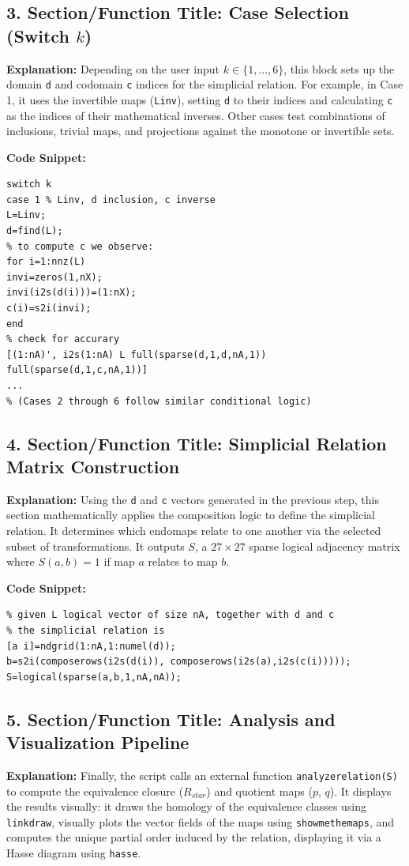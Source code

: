 \subsection{3. Section/Function Title: Case Selection (Switch $k$)}
\textbf{Explanation:} 
Depending on the user input $k \in \{1, \dots, 6\}$, this block sets up the domain \texttt{d} and codomain \texttt{c} indices for the simplicial relation. For example, in Case 1, it uses the invertible maps (\texttt{Linv}), setting \texttt{d} to their indices and calculating \texttt{c} as the indices of their mathematical inverses. Other cases test combinations of inclusions, trivial maps, and projections against the monotone or invertible sets.

\textbf{Code Snippet:}
\begin{lstlisting}
switch k
case 1 % Linv, d inclusion, c inverse
L=Linv;
d=find(L);
% to compute c we observe:
for i=1:nnz(L)
invi=zeros(1,nX);
invi(i2s(d(i)))=(1:nX);
c(i)=s2i(invi);
end
% check for accurary
[(1:nA)', i2s(1:nA) L full(sparse(d,1,d,nA,1)) full(sparse(d,1,c,nA,1))]
...
% (Cases 2 through 6 follow similar conditional logic)
\end{lstlisting}

\subsection{4. Section/Function Title: Simplicial Relation Matrix Construction}
\textbf{Explanation:} 
Using the \texttt{d} and \texttt{c} vectors generated in the previous step, this section mathematically applies the composition logic to define the simplicial relation. It determines which endomaps relate to one another via the selected subset of transformations. It outputs $S$, a $27 \times 27$ sparse logical adjacency matrix where $S(a,b) = 1$ if map $a$ relates to map $b$. 

\textbf{Code Snippet:}
\begin{lstlisting}
% given L logical vector of size nA, together with d and c
% the simplicial relation is
[a i]=ndgrid(1:nA,1:numel(d));
b=s2i(composerows(i2s(d(i)), composerows(i2s(a),i2s(c(i)))));
S=logical(sparse(a,b,1,nA,nA));
\end{lstlisting}

\subsection{5. Section/Function Title: Analysis and Visualization Pipeline}
\textbf{Explanation:} 
Finally, the script calls an external function \texttt{analyzerelation(S)} to compute the equivalence closure ($R_{star}$) and quotient maps ($p$, $q$). It displays the results visually: it draws the homology of the equivalence classes using \texttt{linkdraw}, visually plots the vector fields of the maps using \texttt{showmethemaps}, and computes the unique partial order induced by the relation, displaying it via a Hasse diagram using \texttt{hasse}.

